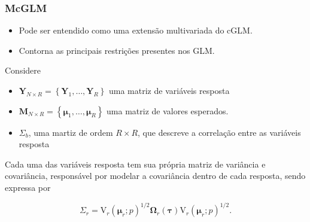 \documentclass[10pt,
  aspectratio=169,
  serif,
  mathserif,
  professionalfont,
  compress,
  handout,
  ]{beamer}\usepackage[]{graphicx}\usepackage[]{color}
\begin{document}

\begin{frame}
  \frametitle{McGLM}
  \begin{itemize}
    \itemsep 2ex
  
  \item Pode ser entendido como uma extensão multivariada do cGLM. 
  
  \item Contorna as principais restrições presentes nos GLM. 

  \end{itemize}
  
  Considere
  
  \begin{itemize}
  \item $\boldsymbol{Y}_{N \times R} = \left \{ \boldsymbol{Y}_1, \dots, \boldsymbol{Y}_R \right \}$ uma matriz de variáveis resposta
  
  \item $\boldsymbol{M}_{N \times R} = \left \{ \boldsymbol{\mu}_1, \dots, \boldsymbol{\mu}_R \right \}$ uma matriz de valores esperados.
  
  \item $\Sigma_b$, uma martiz de ordem $R \times R$, que descreve a correlação entre as variáveis resposta
  
\end{itemize}

  Cada uma das variáveis resposta tem sua própria matriz de variância e covariância, responsável por modelar a covariância dentro de cada resposta, sendo expressa por

\begin{equation}
\Sigma_r =
\mathrm{V}_r\left(\boldsymbol{\mu}_r; p\right)^{1/2}\boldsymbol{\Omega}_r\left(\boldsymbol{\tau}\right)\mathrm{V}_r\left(\boldsymbol{\mu}_r; p\right)^{1/2}.
\end{equation}
  
\end{frame}

\end{document}
